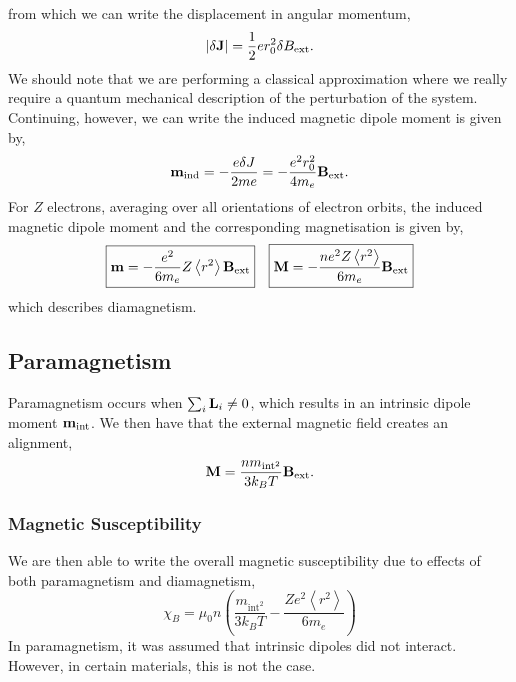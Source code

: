 \documentclass{book}
\begin{document}
from which we can write the displacement in angular momentum,
\begin{equation}
	|\delta \vb{J}| = \frac{1}{2}er_0^2\delta B_{\text{ext}}.
\end{equation}
We should note that we are performing a classical approximation where we really require a quantum mechanical description of the perturbation of the system. Continuing, however, we can write the induced magnetic dipole moment is given by,
\begin{equation}
	\vb{m}_{\text{ind}} = -\frac{e\delta J}{2me} = -\frac{e^2r_0^2}{4m_e}\vb{B}_{\text{ext}}.
\end{equation}
For $Z$ electrons, averaging over all orientations of electron orbits, the induced magnetic dipole moment and the corresponding magnetisation is given by,
\begin{align}
	\boxed{\vb{m} = -\frac{e^2}{6m_e}Z\left<r^2\right>\vb{B}_{\text{ext}}} && \boxed{\vb{M} = -\frac{ne^2Z\left<r^2\right>}{6m_e}\vb{B}_{\text{ext}}}
\end{align}
which describes diamagnetism.
\subsection{Paramagnetism}
Paramagnetism occurs when $\sum_i\vb{L}_i \neq 0$, which results in an intrinsic dipole moment $\vb{m}_\text{int}$. We then have that the external magnetic field creates an alignment,
\begin{equation}
	\vb{M} = \frac{nm_{\text{int}^2}}{3k_B T}\vb{B}_{\text{ext}}.
\end{equation}
\subsubsection{Magnetic Susceptibility}
We are then able to write the overall magnetic susceptibility due to effects of both paramagnetism and diamagnetism,
\begin{equation}
	\boxed{\chi_B = \mu_0n\left(\frac{m_{\text{int}^2}}{3k_BT} - \frac{Ze^2\left<r^2\right>}{6m_e}\right)}
\end{equation}
In paramagnetism, it was assumed that intrinsic dipoles did not interact. However, in certain materials, this is not the case.
\end{document}
